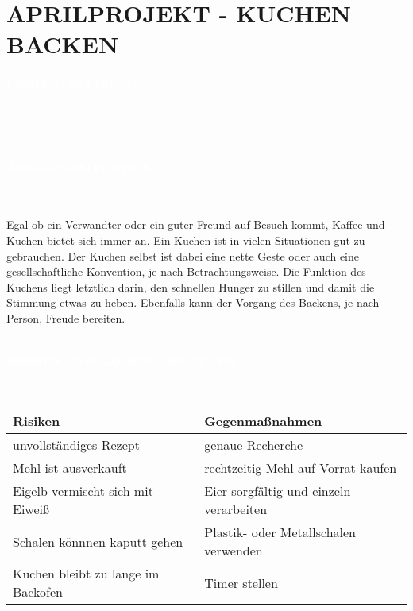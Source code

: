 \documentclass[a4paper, 12 pt]{article}
\newcommand{\coloredSectionDark}[1]{{\small \colorbox{DodgerBlue2}{\begin{minipage}{0.99\textwidth}{\textbf{#1 \vphantom{p\^{E}}}}\end{minipage}}}}
\newcommand{\coloredSection}[1]{{\small \colorbox{DeepSkyBlue1}{\begin{minipage}{0.99\textwidth}{\textbf{#1 \vphantom{p\^{E}}}}\end{minipage}}}}
\begin{document}
\section*{\textcolor{DodgerBlue2}{APRILPROJEKT - KUCHEN BACKEN}}

\noindent
\coloredSectionDark{\textbf{\textcolor{white}{PROJEKTDEFINITION}}}\\[-0.3cm]
\\\\
\coloredSection{\textbf{\textcolor{white}{AUSGANGSSITUATION}}}\\[-0.3cm]
\\
Egal ob ein Verwandter oder ein guter Freund 
auf Besuch kommt, Kaffee und Kuchen bietet sich immer an. Ein Kuchen ist in vielen Situationen gut zu gebrauchen.
Der Kuchen selbst ist dabei eine nette Geste oder auch eine gesellschaftliche Konvention, je nach Betrachtungsweise. Die Funktion
des Kuchens liegt letztlich darin, den schnellen Hunger zu stillen und damit die Stimmung etwas zu heben. Ebenfalls kann der Vorgang des 
Backens, je nach Person, Freude bereiten.\\\\
\noindent
\coloredSection{\textbf{\textcolor{white}{RISIKEN UND GEGENMA{\ss}NAHMEN}}}\\[-0.3cm]
\begin{table}[!ht]
    \begin{tabular*}{\columnwidth}{l|l}
        \hline
        \textbf{Risiken}       & \textbf{Gegenma{\ss}nahmen} \\ \hline 
        unvollständiges Rezept & genaue Recherche            \\ \hline 
        Mehl ist ausverkauft   & rechtzeitig Mehl auf Vorrat kaufen           \\ \hline 
        Eigelb vermischt sich mit Eiweiß & Eier sorgfältig und einzeln verarbeiten \\ \hline 
        Schalen könnnen kaputt gehen                      & Plastik- oder Metallschalen verwenden                           \\ \hline 
        Kuchen bleibt zu lange im Backofen        & Timer stellen                           \\ \hline 
    \end{tabular*}
\end{table}
\end{document}
